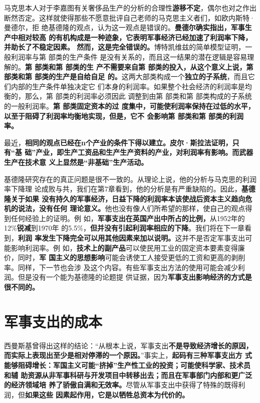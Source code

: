 马克思本人对于李嘉图有关奢侈品生产的分析的合理性\textbf{游移不定}，偶尔也对之作出
断然否定。这样就使得那些不愿意批评自己老师的马克思主义者们，如欧内斯特·曼德尔，拒
绝基德隆的观点，认为这一观点是错误的。\textbf{曼德尔确实指出，军事生产中相对较高
  的有机构成是一种迹象，它表明军事经济已经加速了利润率下降，并助长了不稳定因素。
  然而，这是完全错误的。}博特凯维兹的简单模型证明，一般利润率与第 部类的生产条件
是没有关系的，而且这一结果的潜在逻辑是容易理解的。\textbf{第 部类和第 部类的生
  产不需要来自第 部类的投入，从这个意义上说，第 部类和第 部类的生产是自给自足
  的。}这两大部类构成一个\textbf{独立的子系统}，而且它们内部的生产条件单独决定它
们本身的利润率。如果整个社会经济的利润率是均衡的，那么，第 部类的利润率必须因此
调整到由第 部类和第 部类构成的子系统的一般利润率。\textbf{第 部类固定资本的过
  度集中，可能使利润率保持在过低的水平，以至于阻碍了利润率均衡地实现，但是，它不
  会影响第 部类和第 部类的利润率。}

最近，\textbf{相同的观点已经在n个产业的条件下得以建立。皮尔·斯拉法证明，只有“基
  础”产业，即生产工资品和生产生产资料的产业，对利润率有影响。而武器生产在技术意
  义上显然是“非基础”生产活动。}

基德隆研究存在的真正问题是很不一致的。从理论上说，他的分析与马克思的利润率下降理
论成败与共，我们在第7章看到，他的分析是有严重缺陷的。因此，\textbf{基德隆关于如果
  没有持久的军事经济，日益下降的利润率本该使战后资本主义趋向危机的说法，没有任何
  理论意义。}他也没有像人们所希望的那样，使自己的观点得到任何经验上的证明。例
如，\textbf{军事支出在英国产出中所占的比例，}从1952年的12\%\textbf{锐减}到1970年
的5.5\%，\textbf{但并没有引起利润率相应的下降}。我们将在下一章看到，\textbf{利润
  率发生下降完全可以用其他因素来加以说明。}这并不是否定军事支出可能影响利润率。例
如，\textbf{技术上的副产品}可以使民用工业的固定资本要素变得廉价，同时，\textbf{军
  国主义的思想影响}可能会诱使工人接受更低的工资和更高的剥削率。同样，下一节也会涉
及这个内容。有些军事支出方法的使用可能会减少利润。但是没有一个能为基德隆的论题提
供证据，因为\textbf{军事支出影响经济的方式是很不同的。}

\section{军事支出的成本}
西曼斯基曾得出这样的结论：“从根本上说，军事支出\textbf{不是导致经济增长的原因，
  而实际上表现出至少是相对停滞的一个原因。}”事实上，\textbf{起码有三种军事支出方
  式能够阻碍增长：军国主义可能“挤掉”生产性工业的投资；可能使科学家、技术员和辅
  助资源从非军事科研与开发项目中转移出去；而且在军事部门内部和更广泛的经济领域培
  养了骄傲自满和无效率。}尽管从军事支出中获得了特殊的既得利润，但\textbf{如果这些
  因素起作用，它是以牺牲总资本为代价的。}

